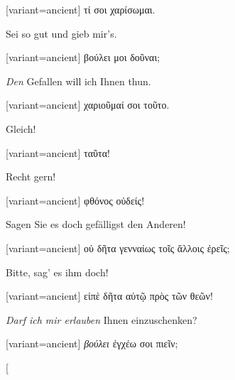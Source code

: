 \begin{greek}[variant=ancient]%
τί σοι χαρίσωμαι.

\end{greek}%
\switchcolumn*

Sei so gut und gieb mir's.

\switchcolumn

\begin{greek}[variant=ancient]%
βούλει μοι δοῦναι;

\end{greek}%
\switchcolumn*

\emph{Den} Gefallen will ich Ihnen thun.

\switchcolumn

\begin{greek}[variant=ancient]%
χαριοῦμαί σοι τοῦτο.

\end{greek}%
\switchcolumn*

Gleich!

\switchcolumn

\begin{greek}[variant=ancient]%
ταῦτα!

\end{greek}%
\switchcolumn*

Recht gern!

\switchcolumn

\begin{greek}[variant=ancient]%
φθόνος οὐδείς!

\end{greek}%
\switchcolumn*

Sagen Sie es doch gefälligst den Anderen!

\switchcolumn

\begin{greek}[variant=ancient]%
οὐ δῆτα γενναίως τοῖς ἄλλοις ἐρεῖς;

\end{greek}%
\switchcolumn*

Bitte, sag' es ihm doch!

\switchcolumn

\begin{greek}[variant=ancient]%
εἰπὲ δῆτα αὐτῷ πρὸς τῶν θεῶν!

\end{greek}%
\switchcolumn*

\emph{Darf ich mir erlauben} Ihnen einzuschenken?

\switchcolumn

\begin{greek}[variant=ancient]%
\emph{βούλει} ἐγχέω σοι πιεῖν;

\end{greek}%
\switchcolumn*[


